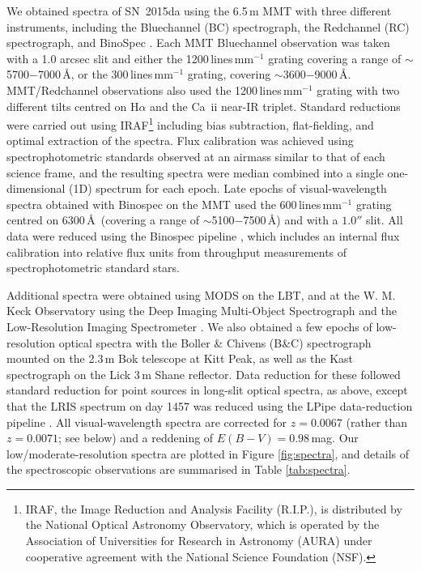 \documentclass[fleqn,usenatbib,useAMS]{mnras}
\begin{document}
We obtained spectra of SN~2015da using the 6.5\,m MMT with three
different instruments, including the Bluechannel (BC) spectrograph,
the Redchannel (RC) spectrograph, and BinoSpec \citep{fabricant19}. Each MMT Bluechannel
observation was taken with a 1.0 arcsec slit and either
the 1200\,lines\,mm$^{-1}$ grating covering a range of
 $\sim$5700$-$7000\,\AA, or the 300\,lines\,mm$^{-1}$ grating, covering 
 $\sim$3600$-$9000\,\AA. MMT/Redchannel observations also used the 1200\,lines\,mm$^{-1}$ grating 
 with two different tilts centred on H$\alpha$ and the Ca~{\sc ii} 
near-IR triplet.    Standard reductions were carried out using IRAF\footnote{IRAF, 
the Image Reduction and Analysis Facility (R.I.P.), is distributed by the
National Optical Astronomy Observatory, which is operated by the Association
of Universities for Research in Astronomy (AURA) under cooperative
agreement with the National Science Foundation (NSF).} including bias 
subtraction, flat-fielding, and optimal extraction
of the spectra. Flux calibration was achieved using spectrophotometric
standards observed at an airmass similar to that of each science
frame, and the resulting spectra were median combined into a single
one-dimensional (1D) spectrum for each epoch.  Late epochs of visual-wavelength spectra
obtained with Binospec on the MMT used
the 600\,lines\,mm$^{-1}$ grating centred on 6300\,\AA\ (covering a range
of $\sim$5100$-$7500\,\AA) and with a $1.0''$ slit. All data
were reduced using the Binospec pipeline \citep{kansky19},
which includes an internal flux calibration into relative flux units
from throughput measurements of spectrophotometric standard
stars.

Additional spectra were obtained using MODS on the LBT, and at the W. M. Keck Observatory 
using the Deep Imaging Multi-Object Spectrograph \citep[DEIMOS;][]{faber03} and 
the Low-Resolution Imaging Spectrometer \citep[LRIS;][]{oke95}.    We also 
obtained a few epochs of low-resolution optical spectra with the Boller \& 
Chivens (B\&C) spectrograph mounted on the 2.3\,m Bok telescope at Kitt Peak, as well as the Kast 
spectrograph \citep{ms93} on the Lick 3\,m Shane reflector.  Data reduction 
for these followed standard reduction for point sources in long-slit optical 
spectra, as above, except that the LRIS spectrum on day 1457 was reduced using the LPipe data-reduction pipeline \citep{perley19}.  All visual-wavelength spectra are corrected for 
$z=0.0067$ (rather than $z=0.0071$; see below) and a reddening of $E(B-V)=0.98$\,mag.  Our 
low/moderate-resolution spectra are plotted in Figure \ref{fig:spectra}, and details of 
the spectroscopic observations are summarised in Table \ref{tab:spectra}.
\end{document}
